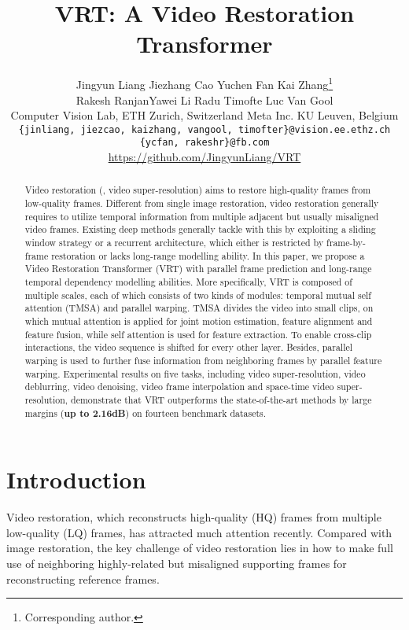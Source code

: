 \documentclass[10pt,twocolumn,letterpaper]{article}
\newlength \g
\begin{document}
\title{VRT: A Video Restoration Transformer}
\author{Jingyun Liang \qquad Jiezhang Cao \qquad Yuchen Fan  \qquad Kai Zhang\thanks{Corresponding author.}\\ Rakesh Ranjan\qquad  \qquad Yawei Li \qquad Radu Timofte \qquad Luc Van Gool \\
 Computer Vision Lab, ETH Zurich, Switzerland \quad
 Meta Inc. \quad  KU Leuven, Belgium\\
{\tt\small \{jinliang, jiezcao, kaizhang, vangool, timofter\}@vision.ee.ethz.ch \quad\{ycfan, rakeshr\}@fb.com}\quad 
{\tt\small }\\
\url{https://github.com/JingyunLiang/VRT}
}
\maketitle

\begin{abstract}
Video restoration (\eg, video super-resolution) aims to restore high-quality frames from low-quality frames. Different from single image restoration, video restoration generally requires to utilize temporal information from multiple adjacent but usually misaligned video frames. Existing deep methods generally tackle with this by exploiting a sliding window strategy or a recurrent architecture, which either is restricted by frame-by-frame restoration or lacks long-range modelling ability. In this paper, we propose a Video Restoration Transformer (VRT) with parallel frame prediction and long-range temporal dependency modelling abilities. More specifically, VRT is composed of multiple scales, each of which consists of two kinds of modules: temporal mutual self attention (TMSA) and parallel warping. TMSA divides the video into small clips, on which mutual attention is applied for joint motion estimation, feature alignment and feature fusion, while self attention is used for feature extraction. To enable cross-clip interactions, the video sequence is shifted for every other layer. Besides, parallel warping is used to further fuse information from neighboring frames by parallel feature warping. Experimental results on five tasks, including video super-resolution, video deblurring, video denoising, video frame interpolation and space-time video super-resolution, demonstrate that VRT outperforms the state-of-the-art methods by large margins (\textbf{up to 2.16dB}) on fourteen benchmark datasets.
\end{abstract}



\section{Introduction}
Video restoration, which reconstructs high-quality (HQ) frames from multiple low-quality (LQ) frames, has attracted much attention recently. Compared with image restoration, the key challenge of video restoration lies in how to make full use of neighboring highly-related but misaligned supporting frames for reconstructing reference frames. 
\end{document}
